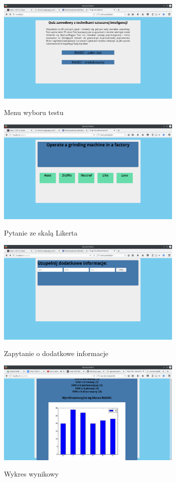 \documentclass[12pt,a4paper,oneside]{report} %
\begin{document}
\begin{figure}
\centering
\includegraphics[width=0.8\textwidth]{4.png}
\label{main-menu}
\caption{Menu wyboru testu}
\end{figure}

\begin{figure}
\centering
\includegraphics[width=0.8\textwidth]{2.png}
\label{questions}
\caption{Pytanie ze skalą Likerta}
\end{figure}

\begin{figure}
\centering
\includegraphics[width=0.8\textwidth]{3.png}
\label{additional-info}
\caption{Zapytanie o dodatkowe informacje}
\end{figure}

\begin{figure}
\centering
\includegraphics[width=0.8\textwidth]{10.png}
\label{outputs}
\caption{Wykres wynikowy}
\end{figure}
\end{document}
